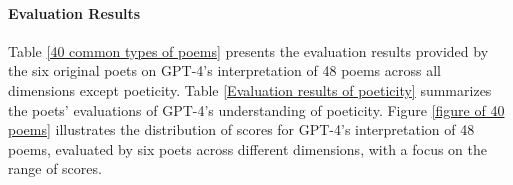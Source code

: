 \documentclass[11pt]{article}
\begin{document}








\paragraph{Evaluation Results}

Table \ref{40 common types of poems} presents the evaluation results provided by the six original poets on GPT-4’s interpretation of 48 poems across all dimensions except poeticity. Table \ref{Evaluation results of poeticity} summarizes the poets’ evaluations of GPT-4’s understanding of poeticity. Figure \ref{figure of 40 poems} illustrates the distribution of scores for GPT-4’s interpretation of 48 poems, evaluated by six poets across different dimensions, with a focus on the range of scores.

\end{document}
